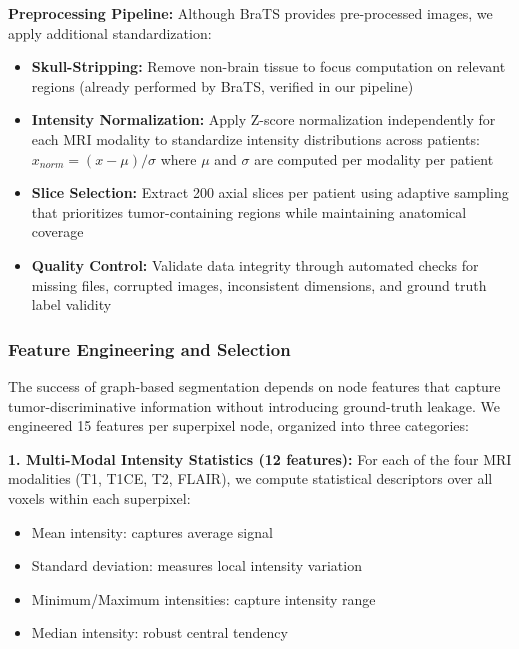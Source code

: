\textbf{Preprocessing Pipeline:} Although BraTS provides pre-processed images, we apply additional standardization:

\begin{itemize}
    \item \textbf{Skull-Stripping:} Remove non-brain tissue to focus computation on relevant regions (already performed by BraTS, verified in our pipeline)
    
    \item \textbf{Intensity Normalization:} Apply Z-score normalization independently for each MRI modality to standardize intensity distributions across patients: $x_{norm} = (x - \mu) / \sigma$ where $\mu$ and $\sigma$ are computed per modality per patient
    
    \item \textbf{Slice Selection:} Extract 200 axial slices per patient using adaptive sampling that prioritizes tumor-containing regions while maintaining anatomical coverage
    
    \item \textbf{Quality Control:} Validate data integrity through automated checks for missing files, corrupted images, inconsistent dimensions, and ground truth label validity
\end{itemize}

\subsubsection{Feature Engineering and Selection}

The success of graph-based segmentation depends on node features that capture tumor-discriminative information without introducing ground-truth leakage. We engineered 15 features per superpixel node, organized into three categories:

\textbf{1. Multi-Modal Intensity Statistics (12 features):} For each of the four MRI modalities (T1, T1CE, T2, FLAIR), we compute statistical descriptors over all voxels within each superpixel:
\begin{itemize}
    \item Mean intensity: captures average signal
    \item Standard deviation: measures local intensity variation
    \item Minimum/Maximum intensities: capture intensity range
    \item Median intensity: robust central tendency
\end{itemize}


